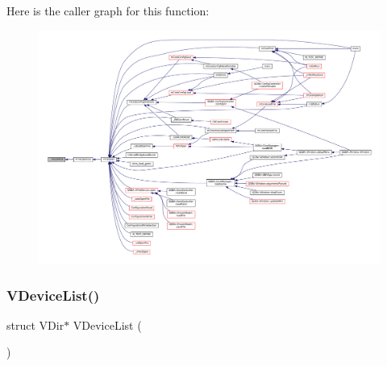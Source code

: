 Here is the caller graph for this function\+:
\nopagebreak
\begin{figure}[H]
\begin{center}
\leavevmode
\includegraphics[width=350pt]{sce-vfs_8c_a5f802766061345000a7795bb2cc0c0d9_icgraph}
\end{center}
\end{figure}
\mbox{\label{sce-vfs_8c_a36b1aed5737fa71dced20925de25a143}} 
\subsubsection{\texorpdfstring{V\+Device\+List()}{VDeviceList()}}
{\footnotesize\ttfamily struct V\+Dir$\ast$ V\+Device\+List (\begin{DoxyParamCaption}{ }\end{DoxyParamCaption})}

